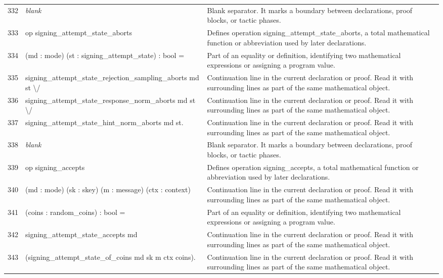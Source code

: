 \documentclass[10pt]{article}
\begin{document}
\begin{longtable}{r L{0.53\textwidth} L{0.37\textwidth}}
332 & {\ttfamily\scriptsize \emph{blank}} & Blank separator.  It marks a boundary between declarations, proof blocks, or tactic phases. \\
333 & {\ttfamily\scriptsize op signing\_attempt\_state\_aborts} & Defines operation signing\_attempt\_state\_aborts, a total mathematical function or abbreviation used by later declarations. \\
334 & {\ttfamily\scriptsize    (md : mode) (st : signing\_attempt\_state) : bool =} & Part of an equality or definition, identifying two mathematical expressions or assigning a program value. \\
335 & {\ttfamily\scriptsize   signing\_attempt\_state\_rejection\_sampling\_aborts md st \textbackslash{}/} & Continuation line in the current declaration or proof.  Read it with surrounding lines as part of the same mathematical object. \\
336 & {\ttfamily\scriptsize   signing\_attempt\_state\_response\_norm\_aborts md st \textbackslash{}/} & Continuation line in the current declaration or proof.  Read it with surrounding lines as part of the same mathematical object. \\
337 & {\ttfamily\scriptsize   signing\_attempt\_state\_hint\_norm\_aborts md st.} & Continuation line in the current declaration or proof.  Read it with surrounding lines as part of the same mathematical object. \\
338 & {\ttfamily\scriptsize \emph{blank}} & Blank separator.  It marks a boundary between declarations, proof blocks, or tactic phases. \\
339 & {\ttfamily\scriptsize op signing\_accepts} & Defines operation signing\_accepts, a total mathematical function or abbreviation used by later declarations. \\
340 & {\ttfamily\scriptsize    (md : mode) (sk : skey) (m : message) (ctx : context)} & Continuation line in the current declaration or proof.  Read it with surrounding lines as part of the same mathematical object. \\
341 & {\ttfamily\scriptsize    (coins : random\_coins) : bool =} & Part of an equality or definition, identifying two mathematical expressions or assigning a program value. \\
342 & {\ttfamily\scriptsize   signing\_attempt\_state\_accepts md} & Continuation line in the current declaration or proof.  Read it with surrounding lines as part of the same mathematical object. \\
343 & {\ttfamily\scriptsize     (signing\_attempt\_state\_of\_coins md sk m ctx coins).} & Continuation line in the current declaration or proof.  Read it with surrounding lines as part of the same mathematical object. \\

\end{longtable}
\end{document}
